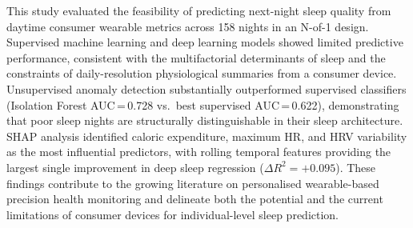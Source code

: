 \documentclass[fleqn,10pt]{wlscirep}
\begin{document}
This study evaluated the feasibility of predicting next-night sleep quality from daytime consumer wearable metrics across 158 nights in an N-of-1 design. Supervised machine learning and deep learning models showed limited predictive performance, consistent with the multifactorial determinants of sleep and the constraints of daily-resolution physiological summaries from a consumer device. Unsupervised anomaly detection substantially outperformed supervised classifiers (Isolation Forest AUC\,=\,0.728 vs.\ best supervised AUC\,=\,0.622), demonstrating that poor sleep nights are structurally distinguishable in their sleep architecture. SHAP analysis identified caloric expenditure, maximum HR, and HRV variability as the most influential predictors, with rolling temporal features providing the largest single improvement in deep sleep regression ($\Delta R^2 = +0.095$). These findings contribute to the growing literature on personalised wearable-based precision health monitoring and delineate both the potential and the current limitations of consumer devices for individual-level sleep prediction.
\end{document}
